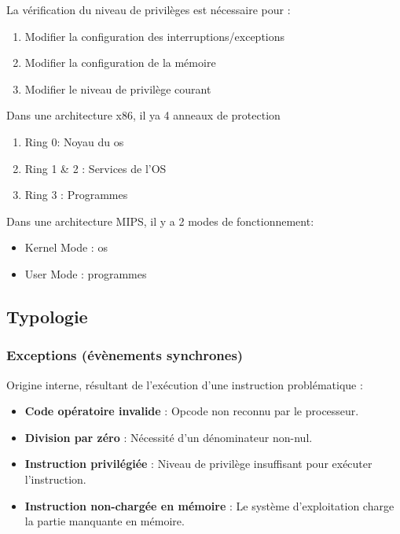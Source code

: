 La vérification du niveau de privilèges est nécessaire pour :
\begin{enumerate}
    \item Modifier la configuration des interruptions/exceptions
    \item Modifier la configuration de la mémoire
    \item Modifier le niveau de privilège courant
\end{enumerate}

Dans une architecture x86, il ya 4 anneaux de protection
\begin{enumerate}
    \item Ring 0: Noyau du os
    \item Ring 1 \& 2 : Services de l'OS
    \item Ring 3 : Programmes
\end{enumerate}

Dans une architecture MIPS, il y a 2 modes de fonctionnement:
\begin{itemize}
    \item Kernel Mode : os
    \item User Mode : programmes
\end{itemize}

\subsection{Typologie}
\subsubsection{Exceptions (évènements synchrones)}
Origine interne, résultant de l’exécution d'une instruction problématique :
\begin{itemize}
    \item \textbf{Code opératoire invalide} : Opcode non reconnu par le processeur.
    \item \textbf{Division par zéro} : Nécessité d’un dénominateur non-nul.
    \item \textbf{Instruction privilégiée} : Niveau de privilège insuffisant pour exécuter l’instruction.
    \item \textbf{Instruction non-chargée en mémoire} : Le système d’exploitation charge la partie manquante en mémoire.
\end{itemize}

